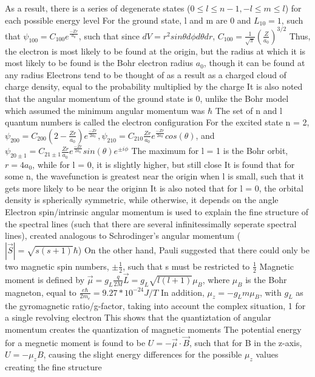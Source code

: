 \documentclass[11 pt, twoside]{article}
\newenvironment{outline*}
{
	\begin{outline}[enumerate]
	}
	{\end{outline}
}
\begin{document}
\begin{outline*}
		\3 As a result, there is a series of degenerate states ($0 \leq l \leq n -1, -l \leq m \leq l$) for each possible energy level
	\2 For the ground state, l and m are 0 and $L_{10} = 1$, such that $\psi_{100} = C_100e^{\frac{-Zr}{a_0}}$, such that since $dV = r^2sin\theta d\phi d\theta dr$, $C_100 = \frac{1}{\sqrt{\pi}}(\frac{Z}{a_0})^{3/2}$
		\3 Thus, the electron is most likely to be found at the origin, but the radius at which it is most likely to be found is the Bohr electron radius $a_0$, though it can be found at any radius
		\3 Electrons tend to be thought of as a result as a charged cloud of charge density, equal to the probability multiplied by the charge
		\3 It is also noted that the angular momentum of the ground state is 0, unlike the Bohr model which assumed the minimum angular momentum was $\hbar$
		\3 The set of n and l quantum numbers is called the electron configuration
	\2 For the excited state n = 2, $\psi_{200} = C_{200}(2 - \frac{Zr}{a_0})e^{\frac{-Zr}{2a_0}}, \psi_{210} = C_{210}\frac{Zr}{a_0}e^{\frac{-Zr}{2a_0}}cos(\theta)$, and $\psi_{20\pm 1} = C_{21 \pm 1}\frac{Zr}{a_0}e^{\frac{-Zr}{2a_0}}sin(\theta)e^{\pm i\phi}$
		\3 The maximum for l = 1 is the Bohr orbit, $r = 4a_0$, while for l = 0, it is slightly higher, but still close
		\3 It is found that for some n, the wavefunction is greatest near the origin when l is small, such that it gets more likely to be near the originn
		\3 It is also noted that for l = 0, the orbital density is spherically symmetric, while otherwise, it depends on the angle
\1 Electron spin/intrinsic angular momentum is used to explain the fine structure of the spectral lines (such that there are several infinitessimally seperate spectral lines), created analogous to Schrodinger's angular momentum ($|\vec{S}| = \sqrt{s(s + 1)}\hbar$)
	\2 On the other hand, Pauli suggested that there could only be two magnetic spin numbers, $\pm \frac{1}{2}$, such that s must be restricted to $\frac{1}{2}$
	\2 Magnetic moment is defined by $\vec{\mu} = g_L\frac{q}{2M}\vec{L} = g_L\sqrt{l(l + 1)}\mu_B$, where $\mu_B$ is the Bohr magneton, equal to $\frac{e\hbar}{2m_e} = 9.27 * 10^{-24} J/T$
		\3 In addition, $\mu_z = -g_Lm\mu_B$, with $g_L$ as the gyromagnetic ratio/g-factor, taking into account the complex situation, 1 for a single revolving electron
		\3 This shows that the quantiztation of angular momentum creates the quantization of magnetic moments
	\2 The potential energy for a megnetic moment is found to be $U = -\vec{\mu} \cdot \vec{B}$, such that for B in the z-axis, $U = -\mu_zB$, causing the slight energy differences for the possible $\mu_z$ values creating the fine structure

\end{outline*}
\end{document}
